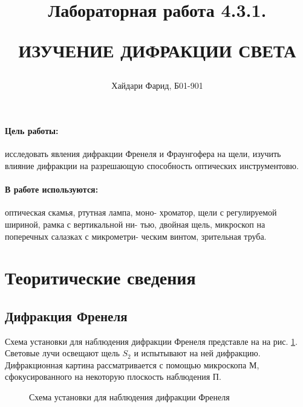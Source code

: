 \documentclass[a5paper,10pt, twoside]{article} %
\title
{
	\hfill \break	\hfill \break
	\hfill \break	\hfill \break
  \hfill \break	\hfill \break
	Лабораторная работа 4.3.1.
	
	ИЗУЧЕНИЕ ДИФРАКЦИИ СВЕТА
}
\author{Хайдари Фарид, Б01-901}
\begin{document}
	
\maketitle


\thispagestyle{empty} %

\newpage

\tableofcontents %

\newpage


\paragraph{Цель работы:}

	исследовать явления дифракции Френеля и Фраунгофера на щели, изучить влияние дифракции на 
	разрешающую способность оптических инструментовю.

\paragraph{В работе используются:}

	оптическая скамья, ртутная лампа, моно-
	хроматор, щели с регулируемой шириной, рамка с вертикальной ни-
	тью, двойная щель, микроскоп на поперечных салазках с микрометри-
	ческим винтом, зрительная труба.

\section{Теоритические сведения}

\subsection{Дифракция Френеля}
	Схема установки для наблюдения дифракции Френеля представле на на рис. \ref{img:scheme0}.
	Световые лучи освещают щель $S_2$ и испытывают на ней дифракцию. Дифракционная картина
	рассматривается с помощью микроскопа $\text{М}$, сфокусированного на некоторую плоскость
	наблюдения $\text{П}$.

	\begin{figure}[h]\label{img:scheme0}
		\caption{Схема установки для наблюдения дифракции Френеля}
	\end{figure}
\end{document}
